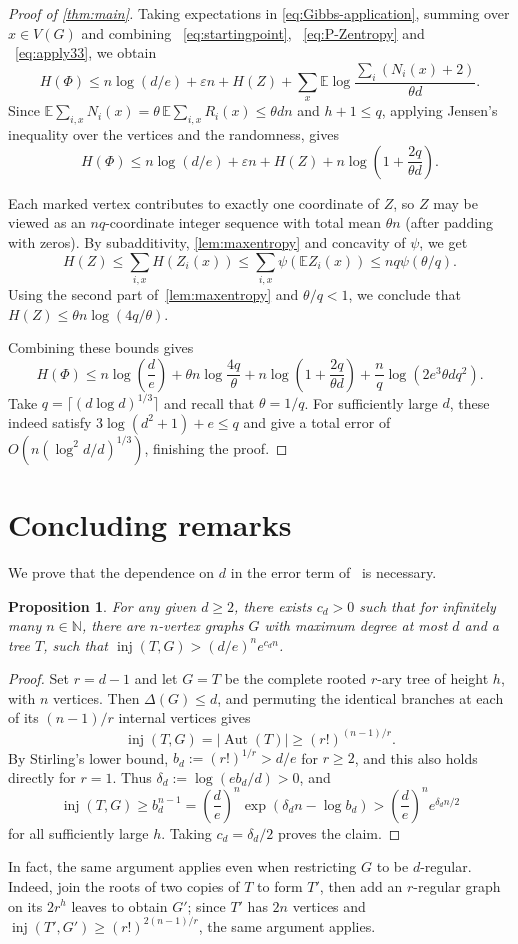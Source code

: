 \documentclass[10pt,a4paper]{amsart}
\numberwithin{equation}{section}
\newtheorem{proposition}[theorem]{Proposition}
\theoremstyle{definition}
\theoremstyle{remark}
\DeclareMathOperator{\Aut}{Aut}
\DeclareMathOperator{\inj}{inj}
\newcommand{\eps}{\varepsilon}
\begin{document}
\begin{proof}[Proof of \cref{thm:main}]
Taking expectations in \eqref{eq:Gibbs-application}, summing over $x\in V(G)$ and combining ~\eqref{eq:startingpoint},  ~\eqref{eq:P-Zentropy} and ~\eqref{eq:apply33}, we obtain
\[
H(\Phi)\le
n\log(d/e)+\eps n+H(Z)
+\sum_x\mathbb E\log\frac{\sum_i(N_i(x)+2)}{\theta d}.
\]
Since $\mathbb E\sum_{i,x}N_i(x) =\theta\,\mathbb E\sum_{i,x}R_i(x) \le\theta dn$ and $h+1\le q$, applying Jensen's inequality over the vertices and the randomness, gives
$$H(\Phi)\leq n\log(d/e)+\eps n+H(Z)+n\log\left(1+\frac{2q}{\theta d}\right).$$

Each marked vertex contributes to exactly one coordinate of $Z$, so $Z$ may be viewed as an $nq$-coordinate integer sequence with total mean $\theta n$ (after padding with zeros). By subadditivity, \cref{lem:maxentropy} and concavity of $\psi$, we get
$$H(Z)\leq \sum_{i,x}H(Z_i(x))\leq \sum_{i,x}\psi(\mathbb{E}Z_i(x))\leq nq\psi(\theta/q).$$
Using the second part of~\cref{lem:maxentropy} and $\theta/q<1$, we conclude that $H(Z) \leq \theta n \log (4q / \theta)$.

Combining these bounds gives 
$$H(\Phi)\leq n\log\left(\frac de\right)+\theta n\log \frac{4q}{\theta}+n\log\left(1+\frac{2q}{\theta d}\right)+\frac{n}{q}\log(2e^3\theta d q^2).$$
Take $q=\lceil(d\log d)^{1/3}\rceil$ and recall that $\theta=1/q$.
For sufficiently large $d$, these indeed satisfy $3\log(d^2+1)+e\leq q$ and give a total error of $O(n(\log^2 d/d)^{1/3})$, finishing the proof.
\end{proof}


\section{Concluding remarks}\label{sec:concluding}
We prove that the dependence on $d$ in the error term of~ is necessary.
\begin{proposition}\label{prop:example}
    For any given $d\geq 2$, there exists $c_d>0$ such that for infinitely many $n\in \mathbb N$, there are $n$-vertex graphs $G$ with maximum degree at most $d$ and a tree $T$, such that $\inj(T,G)> (d/e)^n e^{c_d n}$.
\end{proposition}
\begin{proof}
Set $r=d-1$ and let $G=T$ be the complete rooted $r$-ary tree of height $h$, with $n$ vertices. Then $\Delta(G)\le d$, and permuting the identical branches at each of its $(n-1)/r$ internal vertices gives
\[
    \inj(T,G)=|\Aut(T)|\ge (r!)^{(n-1)/r}.
\]
By Stirling's lower bound, $b_d:=(r!)^{1/r}>d/e$ for $r\ge2$, and this also holds directly for $r=1$. Thus $\delta_d:=\log(eb_d/d)>0$, and
\[
    \inj(T,G)\ge b_d^{n-1}
    =\left(\frac de\right)^n\exp\!\left(\delta_dn-\log b_d\right)
    >\left(\frac de\right)^n e^{\delta_dn/2}
\]
for all sufficiently large $h$. Taking $c_d=\delta_d/2$ proves the claim.
\end{proof}
In fact, the same argument applies even when restricting $G$ to be $d$-regular. Indeed, join the roots of two copies of $T$ to form $T'$, then add an $r$-regular graph on its $2r^h$ leaves to obtain $G'$; since $T'$ has $2n$ vertices and $\inj(T',G')\ge(r!)^{2(n-1)/r}$, the same argument applies.
\end{document}
